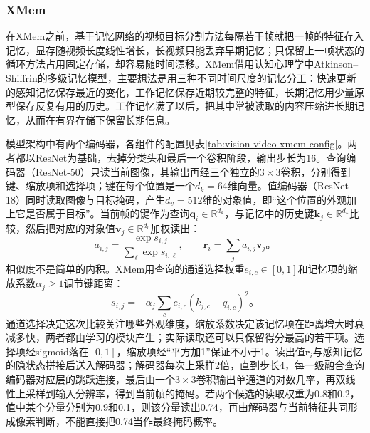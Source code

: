\subsubsection{XMem}
\label{sec:vision-video-xmem}

在XMem之前，基于记忆网络的视频目标分割方法每隔若干帧就把一帧的特征存入记忆，显存随视频长度线性增长，长视频只能丢弃早期记忆；只保留上一帧状态的循环方法占用固定存储，却容易随时间漂移。XMem借用认知心理学中Atkinson--Shiffrin的多级记忆模型，主要想法是用三种不同时间尺度的记忆分工：快速更新的感知记忆保存最近的变化，工作记忆保存近期较完整的特征，长期记忆用少量原型保存反复有用的历史。工作记忆满了以后，把其中常被读取的内容压缩进长期记忆，从而在有界存储下保留长期信息。

模型架构中有两个编码器，各组件的配置见表\ref{tab:vision-video-xmem-config}。两者都以ResNet为基础，去掉分类头和最后一个卷积阶段，输出步长为16。查询编码器（ResNet-50）只读当前图像，其输出再经三个独立的$3\times3$卷积，分别得到键、缩放项和选择项；键在每个位置是一个$d_k=64$维向量。值编码器（ResNet-18）同时读取图像与目标掩码，产生$d_v=512$维的对象值，即“这个位置的外观加上它是否属于目标”。当前帧的键作为查询$\bm{q}_i\in\mathbb{R}^{d_k}$，与记忆中的历史键$\bm{k}_j\in\mathbb{R}^{d_k}$比较，然后把对应的对象值$\bm{v}_j\in\mathbb{R}^{d_v}$加权读出：
\begin{equation}
  a_{i,j}=\frac{\exp s_{i,j}}{\sum_\ell\exp s_{i,\ell}},
  \qquad
  \bm{r}_i=\sum_j a_{i,j}\bm{v}_j\text{。}
  \label{eq:vision-video-memory-read}
\end{equation}
相似度不是简单的内积。XMem用查询的通道选择权重$e_{i,c}\in[0,1]$和记忆项的缩放系数$\alpha_j\geq1$调节键距离：
\[
  s_{i,j}=-\alpha_j\sum_c e_{i,c}(k_{j,c}-q_{i,c})^2\text{。}
\]
通道选择决定这次比较关注哪些外观维度，缩放系数决定该记忆项在距离增大时衰减多快，两者都由学习的模块产生；实际读取还可以只保留得分最高的若干项。选择项经sigmoid落在$[0,1]$，缩放项经“平方加1”保证不小于1。读出值$\bm{r}_i$与感知记忆的隐状态拼接后送入解码器；解码器每次上采样2倍，直到步长4，每一级融合查询编码器对应层的跳跃连接，最后由一个$3\times3$卷积输出单通道的对数几率，再双线性上采样到输入分辨率，得到当前帧的掩码。若两个候选的读取权重为0.8和0.2，值中某个分量分别为0.9和0.1，则该分量读出0.74，再由解码器与当前特征共同形成像素判断，不能直接把0.74当作最终掩码概率。

